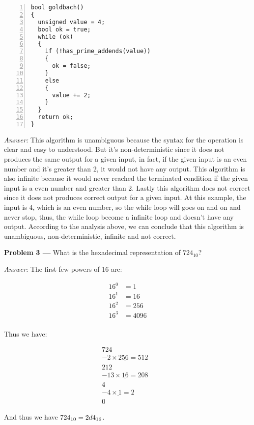 \documentclass[11pt]{article}
\newcommand{\problem}[1]{\vspace*{2ex}\textbf{Problem #1 ---} }
\newcommand{\answer}{\textit{Answer: }}
\begin{document}
\begin{Verbatim}[numbers=left,xleftmargin=5mm]
bool goldbach()
{
  unsigned value = 4;
  bool ok = true;
  while (ok)
  {
    if (!has_prime_addends(value))
    {
      ok = false;
    }
    else
    {
      value += 2;
    }
  }
  return ok;
}
\end{Verbatim}

\answer This algorithm is unambiguous because the syntax for the operation is 
clear and easy to understood. But it's non-deterministic since it does not produces 
the same output for a given input, in fact, if the given input is an even number and 
it's greater than 2, it would not have any output. This algorithm is also infinite 
because it would never reached the terminated condition if the given input is a even 
number and greater than 2. Lastly this algorithm does not correct since it does not 
produces correct output for a given input. At this example, the input is 4, which is 
an even number, so the while loop will goes on and on and never stop, thus, the while
loop become a infinite loop and doesn't have any output. According to the analysis 
above, we can conclude that this algorithm is unambiguous, non-deterministic, 
infinite and not correct.

\problem{3} What is the hexadecimal representation of $724_{10}$?

\answer The first few powers of 16 are:

\begin{align*}
16^0 &= 1\\
16^1 &= 16\\
16^2 &= 256\\
16^3 &= 4096\\
\end{align*}

Thus we have:

\begin{equation*}
\begin{split}
724&\\
\underline{-2 \times 256 = 512}&\\
212&\\
\underline{-13 \times 16 = 208}&\\
4&\\
\underline{-4 \times 1 = 2}&\\
0&
\end{split}
\end{equation*}

And thus we have $724_{10} = 2d4_{16} \\$.
\end{document}
